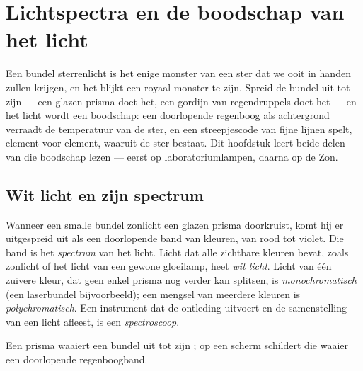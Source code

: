\chapter{Lichtspectra en de boodschap van het licht}\label{ch:g10:light-spectra}

Een bundel sterrenlicht is het enige monster van een ster dat we ooit in
handen zullen krijgen, en het blijkt een royaal monster te zijn. Spreid
de bundel uit tot zijn  --- een glazen prisma doet het, een
gordijn van regendruppels doet het --- en het licht wordt een boodschap:
een doorlopende regenboog als achtergrond verraadt de temperatuur van de
ster, en een streepjescode van fijne lijnen spelt, element voor element,
waaruit de ster bestaat. Dit hoofdstuk leert beide delen van die
boodschap lezen --- eerst op laboratoriumlampen, daarna op de Zon.

\section{Wit licht en zijn spectrum}

\begin{definition}\label{def:g10:light-spectra:white}
Wanneer een smalle bundel zonlicht een glazen prisma doorkruist, komt hij
er uitgespreid uit als een doorlopende band van kleuren, van rood tot
violet. Die band is het \emph{spectrum} van het licht.
Licht dat alle zichtbare kleuren bevat, zoals zonlicht of het licht van
een gewone gloeilamp, heet \emph{wit licht}. Licht van
één zuivere kleur, dat geen enkel prisma nog verder kan splitsen, is
\emph{monochromatisch} (een laserbundel
bijvoorbeeld); een mengsel van meerdere kleuren is
\emph{polychromatisch}. Een instrument dat
de ontleding uitvoert en de samenstelling van een licht afleest, is een
\emph{spectroscoop}.
\end{definition}

\begin{omfigure}

{\small Een prisma waaiert een bundel  uit tot zijn ;
op een scherm schildert die waaier een doorlopende regenboogband.}
\end{omfigure}


